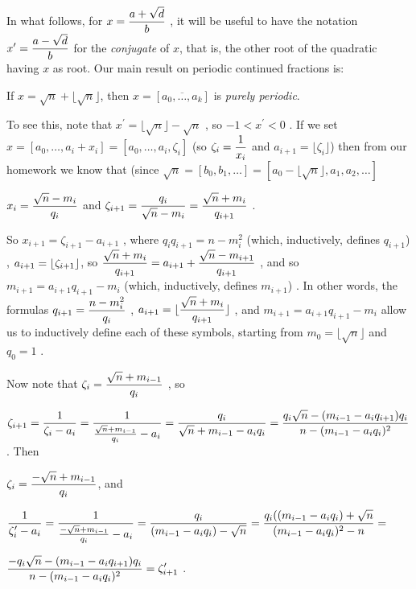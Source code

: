 In what follows, for $\displaystyle x={{a+\sqrt{d}}\over{b}}$ , it will be useful to have the
notation $\displaystyle x^\prime = {{a-\sqrt{d}}\over{b}}$ for the {\it conjugate} of $x$, that
is, the other root of the quadratic having $x$ as root. Our main result on periodic
continued fractions is:

\ssk

If $x=\sqrt{n}+\lfloor \sqrt{n}\rfloor$, then $x=[\overline{a_0,\ldots , a_k}]$ is {\it purely periodic}.

\ssk

To see this, note that $x^\prime = \lfloor \sqrt{n}\rfloor - \sqrt{n}$ , so $-1<x^\prime < 0$ .
If we set $x=[a_0,\ldots , a_i+x_i] = [a_0,\ldots , a_i,\zeta_i]$ (so $\displaystyle \zeta_i={{1}\over{x_i}}$  
and $a_{i+1} = \lfloor\zeta_i \rfloor$) then from our homework we know that (since
$\sqrt{n} = [b_0,b_1,\ldots] = [a_0-\lfloor\sqrt{n}\rfloor,a_1,a_2,\ldots]$

$\displaystyle x_i = {{\sqrt{n}-m_i}\over{q_i}}$ and 
$\displaystyle \zeta_{i+1} = {{q_i}\over{\sqrt{n}-m_i}} = {{\sqrt{n}+m_i}\over{q_{i+1}}}$ . 

So
$x_{i+1} = \zeta_{i+1}-a_{i+1}$ , where $q_iq_{i+1} = n-m_i^2$ (which, inductively, defines
$q_{i+1}$) , 
$\displaystyle a_{i+1} = \lfloor\zeta_{i+1}\rfloor$, so $\displaystyle  {{\sqrt{n}+m_i}\over{q_{i+1}}} = a_{i+1} + {{\sqrt{n}-m_{i+1}}\over{q_{i+1}}}$ , and so
$m_{i+1} = a_{i+1}q_{i+1} - m_i$ (which, inductively, defines $m_{i+1}$) . 
In other words, the formulas 
$\displaystyle q_{i+1} = {{n-m_i^2}\over{q_i}}$ , 
$\displaystyle a_{i+1}=\lfloor{{\sqrt{n}+m_i}\over{q_{i+1}}}\rfloor$ , 
and $m_{i+1} = a_{i+1}q_{i+1} - m_i$ allow us to inductively 
define each of these symbols, starting from 
$m_0=\lfloor\sqrt{n}\rfloor$ and $q_0=1$ .

\ssk

Now note that $\displaystyle \zeta_i = {{\sqrt{n}+m_{i-1}}\over{q_i}}$ , so 

$\displaystyle \zeta_{i+1} = {{1}\over{\zeta_i-a_i}} = {{1}\over{{{\sqrt{n}+m_{i-1}}\over{q_i}} - a_i}}
= {{q_i}\over{\sqrt{n}+m_{i-1} - a_iq_i}}
 = {{q_i\sqrt{n}-(m_{i-1}-a_iq_{i+1})q_i}\over{n-(m_{i-1}-a_iq_i)^2}}$ . Then

$\displaystyle \zeta_i = {{-\sqrt{n}+m_{i-1}}\over{q_i}}$, and 

$\displaystyle {{1}\over{\zeta_i^\prime-a_i}} = 
{{1}\over{{{-\sqrt{n}+m_{i-1}}\over{q_i}} - a_i}} = {{q_i}\over{(m_{i-1}-a_iq_i)-\sqrt{n}}} = 
{{q_i((m_{i-1}-a_iq_i)+\sqrt{n}}\over{(m_{i-1}-a_iq_i)^2-n}} = $

$\displaystyle {{-q_i\sqrt{n}-(m_{i-1}-a_iq_{i+1})q_i}\over{n-(m_{i-1}-a_iq_i)^2}} = \zeta_{i+1}^\prime$ .

